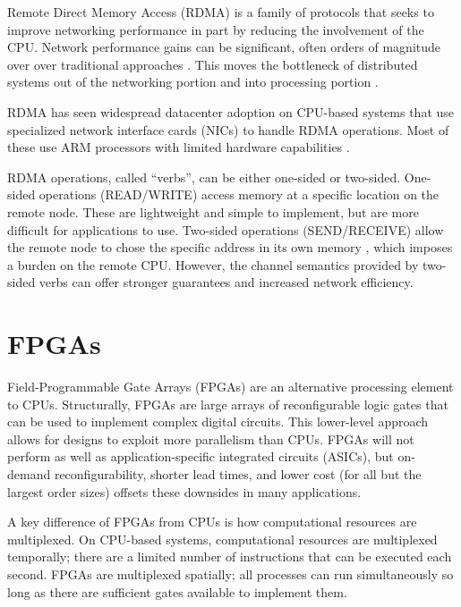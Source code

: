 Remote Direct Memory Access (RDMA) is a family of protocols that seeks to improve networking performance in part by reducing the involvement of the CPU. Network performance gains can be significant, often orders of magnitude over over traditional approaches \autocite{ma-tpds-2022,rdma-reads}. This moves the bottleneck of distributed systems out of the networking portion and into processing portion \autocite{binnig-vldb-2016}.

RDMA has seen widespread datacenter adoption \autocite{strom,mencer-queue-2020} on CPU-based systems that use specialized network interface cards (NICs) to handle RDMA operations. Most of these use ARM processors with limited hardware capabilities \autocite{strom,honeycomb,rdma-reads}.


RDMA operations, called ``verbs'', can be either one-sided or two-sided. One-sided operations (READ/WRITE) access memory at a specific location on the remote node. These are lightweight and simple to implement, but are more difficult for applications to use. Two-sided operations (SEND/RECEIVE) allow the remote node to chose the specific address in its own memory \autocite{base}, which imposes a burden on the remote CPU. However, the channel semantics provided by two-sided verbs can offer stronger guarantees and increased network efficiency.


\section{FPGAs}
\label{sec:fpga}

Field-Programmable Gate Arrays (FPGAs) are an alternative processing element to CPUs. Structurally, FPGAs are large arrays of reconfigurable logic gates that can be used to implement complex digital circuits. This lower-level approach allows for designs to exploit more parallelism than CPUs. FPGAs will not perform as well as application-specific integrated circuits (ASICs), but on-demand reconfigurability, shorter lead times, and lower cost (for all but the largest order sizes) offsets these downsides in many applications.

A key difference of FPGAs from CPUs is how computational resources are multiplexed. On CPU-based systems, computational resources are multiplexed temporally; there are a limited number of instructions that can be executed each second. FPGAs are multiplexed spatially; all processes can run simultaneously so long as there are sufficient gates available to implement them.

